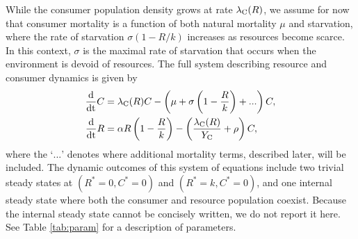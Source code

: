 \documentclass[]{rsos}%
\begin{document}
While the consumer population density grows at rate $\lambda_{\rm C}(R)$, we assume for now that consumer mortality is a function of both natural mortality $\mu$ and starvation, where the rate of starvation $\sigma(1-R/k)$ increases as resources become scarce.
In this context, $\sigma$ is the maximal rate of starvation that occurs when the environment is devoid of resources.
The full system describing resource and consumer dynamics is given by
\begin{align}
    \frac{{\rm d}}{{\rm dt}}C &= \lambda_{\rm C}(R)C - \left(\mu + \sigma \left(1 - \frac{R}{k} \right)+...\right)C, \nonumber \\ 
    \frac{{\rm d}}{{\rm dt}}R &= \alpha R \left(1 - \frac{R}{k} \right) - \left(\frac{\lambda_{\rm C}(R)}{Y_{\rm C}} + \rho \right)C,
    \label{eq:2d}
\end{align}
where the `$...$' denotes where additional mortality terms, described later, will be included.
The dynamic outcomes of this system of equations include two trivial steady states at $(R^*=0, C^*=0)$ and $(R^*=k,C^*=0)$, and one internal steady state where both the consumer and resource population coexist.
Because the internal steady state cannot be concisely written, we do not report it here.
See Table \ref{tab:param} for a description of parameters.
\end{document}
